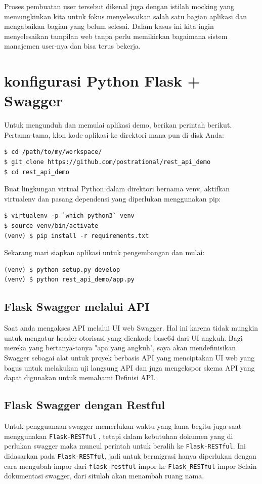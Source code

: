 \documentclass[12pt]{article}
\begin{document}
Proses pembuatan user tersebut dikenal juga dengan istilah mocking yang memungkinkan kita untuk fokus menyelesaikan salah satu bagian aplikasi dan mengabaikan bagian yang belum selesai. Dalam kasus ini kita ingin menyelesaikan tampilan web tanpa perlu memikirkan bagaimana sistem manajemen user-nya dan bisa terus bekerja.




\section{konfigurasi Python Flask + Swagger}
Untuk mengunduh dan memulai aplikasi demo, berikan perintah berikut. Pertama-tama, klon kode aplikasi ke direktori mana pun di disk Anda:
\begin{verbatim}
$ cd /path/to/my/workspace/
$ git clone https://github.com/postrational/rest_api_demo
$ cd rest_api_demo
\end{verbatim}
Buat lingkungan virtual Python dalam direktori bernama venv, aktifkan virtualenv dan pasang dependensi yang diperlukan menggunakan pip:
\begin{verbatim}
$ virtualenv -p `which python3` venv
$ source venv/bin/activate
(venv) $ pip install -r requirements.txt
\end{verbatim}
Sekarang mari siapkan aplikasi untuk pengembangan dan mulai:
\begin{verbatim}
(venv) $ python setup.py develop
(venv) $ python rest_api_demo/app.py
\end{verbatim}
\cite{de2017api}

\subsection{Flask Swagger melalui API}
Saat anda mengakses API melalui UI web Swagger. Hal ini karena tidak mungkin untuk mengatur header otorisasi yang dienkode base64 dari UI angkuh. Bagi mereka yang bertanya-tanya "apa yang angkuh", saya akan mendefinisikan Swagger sebagai alat untuk proyek berbasis API yang menciptakan UI web yang bagus untuk melakukan uji langsung API dan juga mengekspor skema API yang dapat digunakan untuk memahami Definisi API.

\subsection{Flask Swagger dengan Restful}
Untuk pengguanaan swagger memerlukan waktu yang lama begitu juga saat menggunakan \verb|Flask-RESTful| , tetapi dalam kebutuhan dokumen yang di perlukan swagger maka muncul perintah untuk beralih ke \verb|Flask-RESTful|. Ini didasarkan pada \verb|Flask-RESTful|, jadi untuk bermigrasi hanya diperlukan dengan cara mengubah impor dari \verb|flask_restful|  impor ke \verb|Flask_RESTful| impor Selain dokumentasi swagger, dari situlah akan menambah ruang nama.
\end{document}
